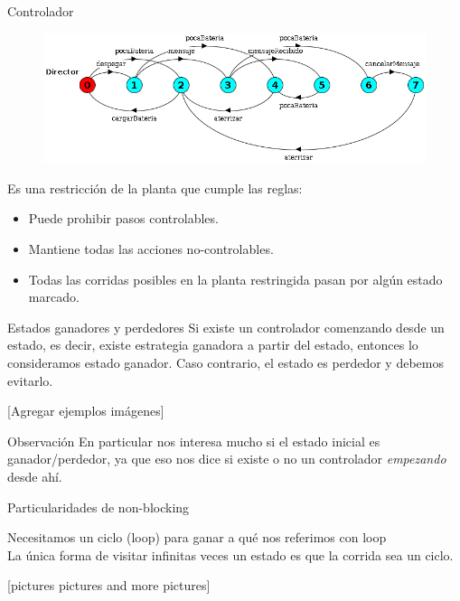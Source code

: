 \begin{frame}{Controlador}
    \begin{figure}
     \includegraphics[width=\textwidth]{figures/director.png}
    \end{figure}

    Es una restricción de la planta que cumple las reglas:

    \begin{itemize}
     \item Puede prohibir pasos controlables.
     \item Mantiene todas las acciones no-controlables.
     \item Todas las corridas posibles en la planta restringida pasan por algún estado marcado.
    \end{itemize}
\end{frame}
\begin{frame}{Estados ganadores y perdedores}
    Si existe un controlador comenzando desde un estado, es decir, existe estrategia ganadora a partir del estado, entonces lo consideramos estado ganador. 
    Caso contrario, el estado es perdedor y debemos evitarlo.
    
    [Agregar ejemplos imágenes]
    
    \begin{block}{Observación}
        En particular nos interesa mucho si el estado inicial es ganador/perdedor, ya que eso nos dice si existe o no un controlador \textit{empezando} desde ahí.
    \end{block}

\end{frame}
\begin{frame}{Particularidades de non-blocking}
    \begin{block}{Necesitamos un ciclo (loop) para ganar}
        a qué nos referimos con loop\\
        La única forma de visitar infinitas veces un estado es que la corrida sea un ciclo.
    \end{block}
    
    [pictures pictures and more pictures]
\end{frame}
